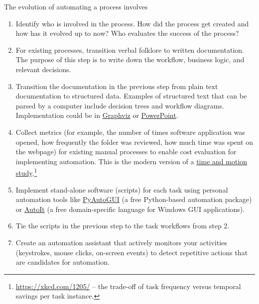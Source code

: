 The evolution of automating a process involves
\begin{enumerate}
    \item Identify who is involved in the process. How did the process get created and how has it evolved up to now? Who evaluates the success of the process? 
    \item For existing processes, transition verbal folklore to written documentation. The purpose of this step is to write down the workflow, business logic, and relevant decisions. 
    \item Transition the documentation in the previous step from plain text documentation to structured data. Examples of structured text that can be parsed by a computer include  decision trees and workflow diagrams. Implementation could be in 
    \href{https://en.wikipedia.org/wiki/Graphviz}{Graphviz} or  \href{https://en.wikipedia.org/wiki/Microsoft_PowerPoint}{PowerPoint}.
    \item Collect metrics (for example, the number of times software application was opened, how frequently the folder was reviewed, how much  time was spent on the webpage) for existing manual processes to enable cost evaluation for implementing automation. This is the modern version of a
    \href{https://en.wikipedia.org/wiki/Time_and_motion_study}{time and motion study}.\footnote{\href{https://xkcd.com/1205/}{https://xkcd.com/1205/} -- the trade-off of task frequency versus temporal savings per task instance.}
    \item Implement stand-alone software (scripts) for each task using personal automation tools like \href{https://pyautogui.readthedocs.io/en/latest/}{PyAutoGUI} (a free Python-based automation package) or \href{https://www.autoitscript.com/site/}{AutoIt} (a free domain-specific language for Windows GUI applications).
    \item Tie the scripts in the previous step to the task workflows from step 2.
    \item Create an automation assistant that actively monitors your activities (keystrokes, mouse clicks, on-screen events) to detect repetitive actions that are candidates for automation.
\end{enumerate}

